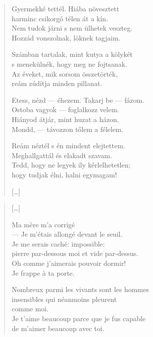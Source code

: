 \documentclass[11pt]{extbook}
\newcommand*{\centeredornament}{\centerline{\pgfornament[width=6cm]{88}}}
\begin{document}
\begin{verse}
  Gyermekké tettél. Hiába növesztett \\
  harminc csikorgó télen át a kín. \\
  Nem tudok járni s nem ülhetek veszteg. \\
  Hozzád vonszolnak, löknek tagjaim.

  Számban tartalak, mint kutya a kölykét \\
  s menekülnék, hogy meg ne fojtsanak. \\
  Az éveket, mik sorsom összetörték, \\
  reám zúdítja minden pillanat.

  Etess, nézd --- éhezem. Takarj be --- fázom. \\
  Ostoba vagyok --- foglalkozz velem. \\
  Hiányod átjár, mint huzat a házon. \\
  Mondd, --- távozzon tőlem a félelem.

  Reám néztél s én mindent elejtettem. \\
  Meghallgattál és elakadt szavam. \\
  Tedd, hogy ne legyek ily kérlelhetetlen; \\
  hogy tudjak élni, halni egymagam!

  \hfill [\ldots]
\end{verse}

\newpage


\vspace*{-15mm}
\centeredornament


\poemtitle*{\phantom{Tu as fait de moi un enfant}}

\begin{verse}
  \textnormal{[\ldots]}

  Ma mère m'a corrigé \\
  --- Je m'étais allongé devant le seuil. \\
  Je me serais caché: impossible: \\
  pierre par-dessous moi et vide par-dessus. \\
  Oh comme j'aimerais pouvoir dormir! \\
  Je frappe à ta porte.

  Nombreux parmi les vivants sont les hommes \\
  insensibles qui néanmoins pleurent \\
  comme moi. \\
  Je t'aime beaucoup parce que je fus capable \\
  de m'aimer beaucoup avec toi.
\end{verse}
\end{document}
